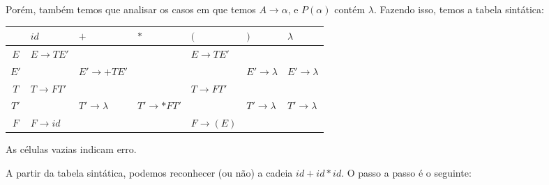 \documentclass{article}
\begin{document}
Porém, também temos que analisar os casos em que temos $A \rightarrow \alpha$, e $P(\alpha)$ contém $\lambda$. Fazendo isso, temos a tabela sintática:

\begin{center}
\begin{tabular}{ |c|m{2cm}|m{2cm}|m{2cm}|m{2cm}|m{2cm}|m{2cm}| } 
 \hline
 & $id$ & $+$ & $*$ & $($ & $)$ & $\lambda$ \\
 \hline
 $E$ & $E \rightarrow TE'$ & $ $ & $ $ & $E \rightarrow TE'$ & $ $ & $ $ \\
 \hline
 $E'$ & $ $ & $E' \rightarrow +TE'$ & $ $ & $ $ & $E' \rightarrow \lambda$ & $E' \rightarrow \lambda$ \\
 \hline
 $T$ & $T \rightarrow FT'$ & $ $ & $ $ & $T \rightarrow FT'$ & $ $ & $ $ \\
 \hline
 $T'$ & $ $ & $T' \rightarrow \lambda$ & $T' \rightarrow *FT'$ & $ $ & $T' \rightarrow \lambda$ & $T' \rightarrow \lambda$ \\
 \hline
 $F$ & $F \rightarrow id$ & $ $ & $ $ & $F \rightarrow (E)$ & $ $ & $ $ \\
 \hline
\end{tabular}
\end{center}

As células vazias indicam erro.

A partir da tabela sintática, podemos reconhecer (ou não) a cadeia $id + id * id$. O passo a passo é o seguinte:
\end{document}
